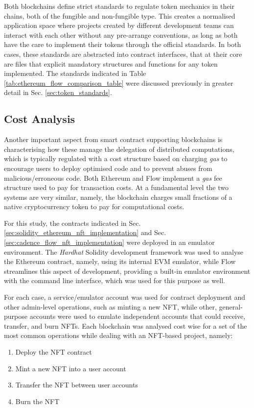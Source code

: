 \documentclass[../main.tex]{subfiles}
\begin{document}
\par
Both blockchains define strict standards to regulate token mechanics in their chains, both of the fungible and non-fungible type. This creates a normalised application space where projects created by different development teams can interact with each other without any pre-arrange conventions, as long as both have the care to implement their tokens through the official standards. In both cases, these standards are abstracted into contract interfaces, that at their core are files that explicit mandatory structures and functions for any token implemented. The standards indicated in Table \ref{tab:ethereum_flow_comparison_table} were discussed previously in greater detail in Sec. \ref{sec:token_standards}.


\subsection{Cost Analysis}
\label{sec:cost_analysis}
Another important aspect from smart contract supporting blockchains is characterising how these manage the delegation of distributed computations, which is typically regulated with a cost structure based on charging \textit{gas} to encourage users to deploy optimised code and to prevent abuses from malicious/erroneous code. Both Ethereum and Flow implement a \textit{gas} fee structure used to pay for transaction costs. At a fundamental level the two systems are very similar, namely, the blockchain charges small fractions of a native cryptocurrency token to pay for computational costs.
\par
For this study, the contracts indicated in Sec. \ref{sec:solidity_ethereum_nft_implementation} and Sec. \ref{sec:cadence_flow_nft_implementation} were deployed in an emulator environment. The \textit{Hardhat} Solidity development framework was used to analyse the Ethereum contract, namely, using its internal EVM emulator, while Flow streamlines this aspect of development, providing a built-in emulator environment with the command line interface, which was used for this purpose as well.
\par
For each case, a service/emulator account was used for contract deployment and other admin-level operations, such as minting a new NFT, while other, general-purpose accounts were used to emulate independent accounts that could receive, transfer, and burn NFTs. Each blockchain was analysed cost wise for a set of the most common operations while dealing with an NFT-based project, namely:
\begin{enumerate}
    \item {Deploy the NFT contract}
    \item {Mint a new NFT into a user account}
    \item {Transfer the NFT between user accounts}
    \item {Burn the NFT}
\end{enumerate}
\end{document}
